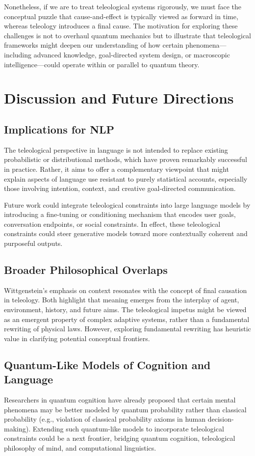 \documentclass[11pt]{article}
\begin{document}
Nonetheless, if we are to treat teleological systems rigorously, we must face the conceptual puzzle that cause-and-effect is typically viewed as forward in time, whereas teleology introduces a final cause. The motivation for exploring these challenges is not to overhaul quantum mechanics but to illustrate that teleological frameworks might deepen our understanding of how certain phenomena---including advanced knowledge, goal-directed system design, or macroscopic intelligence---could operate within or parallel to quantum theory.

\section{Discussion and Future Directions}
\subsection{Implications for NLP}
The teleological perspective in language is not intended to replace existing probabilistic or distributional methods, which have proven remarkably successful in practice. Rather, it aims to offer a complementary viewpoint that might explain aspects of language use resistant to purely statistical accounts, especially those involving intention, context, and creative goal-directed communication.

Future work could integrate teleological constraints into large language models by introducing a fine-tuning or conditioning mechanism that encodes user goals, conversation endpoints, or social constraints. In effect, these teleological constraints could steer generative models toward more contextually coherent and purposeful outputs. 

\subsection{Broader Philosophical Overlaps}
Wittgenstein’s emphasis on context resonates with the concept of final causation in teleology. Both highlight that meaning emerges from the interplay of agent, environment, history, and future aims. The teleological impetus might be viewed as an emergent property of complex adaptive systems, rather than a fundamental rewriting of physical laws. However, exploring fundamental rewriting has heuristic value in clarifying potential conceptual frontiers.

\subsection{Quantum-Like Models of Cognition and Language}
Researchers in quantum cognition have already proposed that certain mental phenomena may be better modeled by quantum probability rather than classical probability (e.g., violation of classical probability axioms in human decision-making). Extending such quantum-like models to incorporate teleological constraints could be a next frontier, bridging quantum cognition, teleological philosophy of mind, and computational linguistics.
\end{document}
